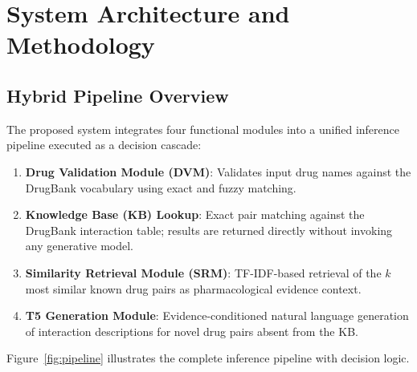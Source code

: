 \documentclass[12pt,a4paper,oneside]{report}
\begin{document}
\chapter{System Architecture and Methodology}
\label{chap:method}

\section{Hybrid Pipeline Overview}

The proposed system integrates four functional modules into a unified inference pipeline
executed as a decision cascade:

\begin{enumerate}
  \item \textbf{Drug Validation Module (DVM)}: Validates input drug names against the
  DrugBank vocabulary using exact and fuzzy matching.
  \item \textbf{Knowledge Base (KB) Lookup}: Exact pair matching against the DrugBank
  interaction table; results are returned directly without invoking any generative model.
  \item \textbf{Similarity Retrieval Module (SRM)}: TF-IDF-based retrieval of the $k$
  most similar known drug pairs as pharmacological evidence context.
  \item \textbf{T5 Generation Module}: Evidence-conditioned natural language generation
  of interaction descriptions for novel drug pairs absent from the KB.
\end{enumerate}

Figure~\ref{fig:pipeline} illustrates the complete inference pipeline with decision logic.
\end{document}
